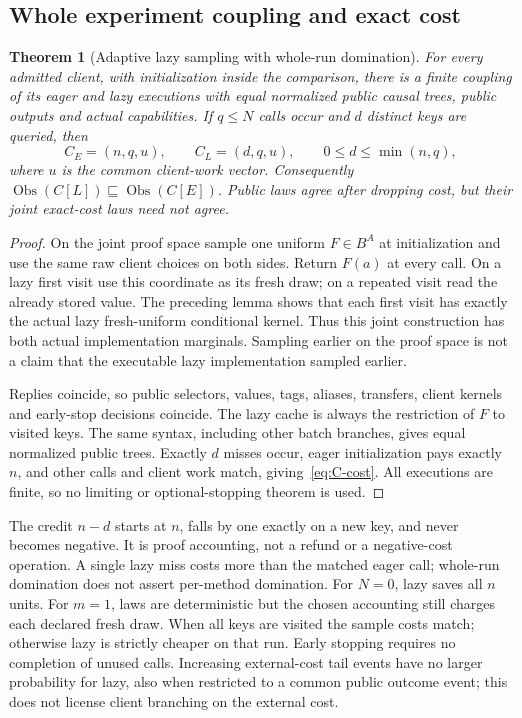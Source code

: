 \documentclass[11pt,a4paper]{article}
\newtheorem{theorem}{Theorem}[section]
\theoremstyle{definition}
\newcommand{\Obs}{\operatorname{Obs}}
\begin{document}
\subsection{Whole experiment coupling and exact cost}\label{sec:C-theorem}
\begin{theorem}[Adaptive lazy sampling with whole-run domination]
For every admitted client, with initialization inside the comparison,
there is a finite coupling of its eager and lazy executions with equal
normalized public causal trees, public outputs and actual capabilities.
If $q\leq N$ calls occur and $d$ distinct keys are queried, then
\begin{equation}\label{eq:C-cost}
C_E=(n,q,u),\qquad C_L=(d,q,u),\qquad
0\leq d\leq\min(n,q),
\end{equation}
where $u$ is the common client-work vector. Consequently
$\Obs(C[L])\sqsubseteq\Obs(C[E])$. Public laws agree after dropping
cost, but their joint exact-cost laws need not agree.
\end{theorem}
\begin{proof}
On the joint proof space sample one uniform $F\in B^A$ at initialization
and use the same raw client choices on both sides. Return $F(a)$ at
every call. On a lazy first visit use this coordinate as its fresh draw;
on a repeated visit read the already stored value. The preceding lemma
shows that each first visit has exactly the actual lazy fresh-uniform
conditional kernel. Thus this joint construction has both actual
implementation marginals. Sampling earlier on the proof space is not a
claim that the executable lazy implementation sampled earlier.

Replies coincide, so public selectors, values, tags, aliases, transfers,
client kernels and early-stop decisions coincide. The lazy cache is
always the restriction of $F$ to visited keys. The same syntax, including
other batch branches, gives equal normalized public trees. Exactly $d$
misses occur, eager initialization pays exactly $n$, and other calls and
client work match, giving~\eqref{eq:C-cost}. All executions are finite,
so no limiting or optional-stopping theorem is used.
\end{proof}
The credit $n-d$ starts at $n$, falls by one exactly on a new key, and
never becomes negative. It is proof accounting, not a refund or a
negative-cost operation. A single lazy miss costs more than the matched
eager call; whole-run domination does not assert per-method domination.
For $N=0$, lazy saves all $n$ units. For $m=1$, laws are deterministic
but the chosen accounting still charges each declared fresh draw. When
all keys are visited the sample costs match; otherwise lazy is strictly
cheaper on that run. Early stopping requires no completion of unused
calls. Increasing external-cost tail events have no larger probability
for lazy, also when restricted to a common public outcome event; this
does not license client branching on the external cost.
\end{document}
